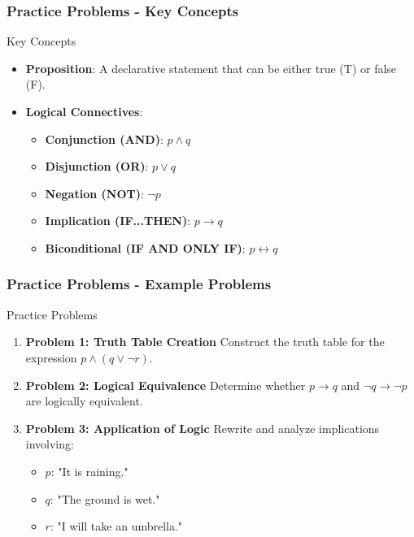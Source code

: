 \documentclass[aspectratio=169]{beamer}
\begin{document}
\begin{frame}[fragile]
    \frametitle{Practice Problems - Key Concepts}
    \begin{block}{Key Concepts}
        \begin{itemize}
            \item \textbf{Proposition}: A declarative statement that can be either true (T) or false (F).
            \item \textbf{Logical Connectives}:
            \begin{itemize}
                \item \textbf{Conjunction (AND)}: $p \land q$
                \item \textbf{Disjunction (OR)}: $p \lor q$
                \item \textbf{Negation (NOT)}: $\neg p$
                \item \textbf{Implication (IF...THEN)}: $p \rightarrow q$
                \item \textbf{Biconditional (IF AND ONLY IF)}: $p \leftrightarrow q$
            \end{itemize}
        \end{itemize}
    \end{block}
\end{frame}

\begin{frame}[fragile]
    \frametitle{Practice Problems - Example Problems}
    \begin{block}{Practice Problems}
        \begin{enumerate}
            \item \textbf{Problem 1: Truth Table Creation}
                Construct the truth table for the expression $p \land (q \lor \neg r)$.
            \item \textbf{Problem 2: Logical Equivalence}
                Determine whether $p \rightarrow q$ and $\neg q \rightarrow \neg p$ are logically equivalent.
            \item \textbf{Problem 3: Application of Logic}
                Rewrite and analyze implications involving:
                \begin{itemize}
                    \item $p$: "It is raining."
                    \item $q$: "The ground is wet."
                    \item $r$: "I will take an umbrella."
                \end{itemize}
        \end{enumerate}
    \end{block}
\end{frame}
\end{document}

